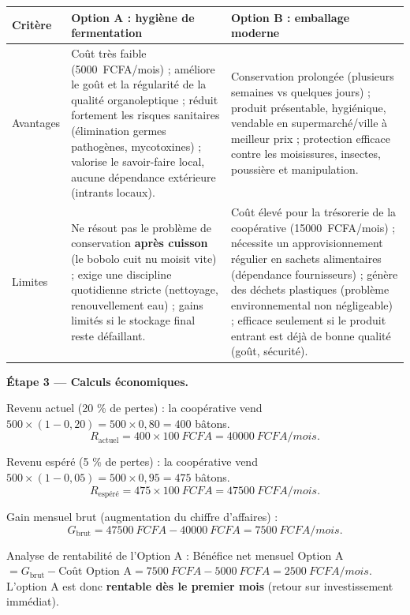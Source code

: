 \documentclass[11pt]{article}
\begin{document}
\begin{exoresolu}
\begin{center}
\begin{tabularx}{\linewidth}{|l|X|X|}
\hline
\rowcolor{popblueL} \textbf{Critère} & \textbf{Option A : hygiène de fermentation} & \textbf{Option B : emballage moderne} \\
\hline
Avantages & Coût très faible (\SI{5 000}{FCFA/mois}) ; améliore le goût et la régularité de la qualité organoleptique ; réduit fortement les risques sanitaires (élimination germes pathogènes, mycotoxines) ; valorise le savoir-faire local, aucune dépendance extérieure (intrants locaux). & Conservation prolongée (plusieurs semaines vs quelques jours) ; produit présentable, hygiénique, vendable en supermarché/ville à meilleur prix ; protection efficace contre les moisissures, insectes, poussière et manipulation. \\
\hline
Limites & Ne résout pas le problème de conservation \textbf{après cuisson} (le bobolo cuit nu moisit vite) ; exige une discipline quotidienne stricte (nettoyage, renouvellement eau) ; gains limités si le stockage final reste défaillant. & Coût élevé pour la trésorerie de la coopérative (\SI{15 000}{FCFA/mois}) ; nécessite un approvisionnement régulier en sachets alimentaires (dépendance fournisseurs) ; génère des déchets plastiques (problème environnemental non négligeable) ; efficace seulement si le produit entrant est déjà de bonne qualité (goût, sécurité). \\
\hline
\end{tabularx}
\end{center}

\textbf{Étape 3 — Calculs économiques.}

Revenu actuel (20 \% de pertes) : la coopérative vend $500 \times (1 - 0{,}20) = 500 \times 0{,}80 = 400$ bâtons.
\[ R_{\text{actuel}} = 400 \times \SI{100}{FCFA} = \SI{40 000}{FCFA/mois}. \]

Revenu espéré (5 \% de pertes) : la coopérative vend $500 \times (1 - 0{,}05) = 500 \times 0{,}95 = 475$ bâtons.
\[ R_{\text{espéré}} = 475 \times \SI{100}{FCFA} = \SI{47 500}{FCFA/mois}. \]

Gain mensuel brut (augmentation du chiffre d'affaires) :
\[ G_{\text{brut}} = \SI{47 500}{FCFA} - \SI{40 000}{FCFA} = \SI{7 500}{FCFA/mois}. \]

Analyse de rentabilité de l'Option A :
Bénéfice net mensuel Option A $= G_{\text{brut}} - \text{Coût Option A} = \SI{7 500}{FCFA} - \SI{5 000}{FCFA} = \SI{2 500}{FCFA/mois}$.
L'option A est donc \textbf{rentable dès le premier mois} (retour sur investissement immédiat).


\end{exoresolu}
\end{document}
